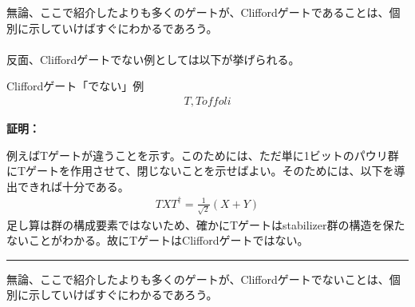 \documentclass[a4paper,10.5pt]{article}
\numberwithin{equation}{section}
\newenvironment{proofbox}
{\begin{prooflabel}\textbf{証明：}\end{prooflabel}\vspace{0.8em}}
{\par\vspace{1em}\hrule\vspace{1em}}
\begin{document}
無論、ここで紹介したよりも多くのゲートが、Cliffordゲートであることは、個別に示していけばすぐにわかるであろう。\\
\\
反面、Cliffordゲートでない例としては以下が挙げられる。
\begin{resultbox}{Cliffordゲート「でない」例}
   \begin{align*}
        T,Toffoli
   \end{align*}
\end{resultbox}
\begin{proofbox}
例えばTゲートが違うことを示す。このためには、ただ単に1ビットのパウリ群にTゲートを作用させて、閉じないことを示せばよい。そのためには、以下を導出できれば十分である。
\begin{align*}
    TXT^{\dagger}=\frac{1}{\sqrt{2}}(X+Y)
\end{align*}
足し算は群の構成要素ではないため、確かにTゲートはstabilizer群の構造を保たないことがわかる。故にTゲートはCliffordゲートではない。
\end{proofbox}
無論、ここで紹介したよりも多くのゲートが、Cliffordゲートでないことは、個別に示していけばすぐにわかるであろう。
\end{document}
